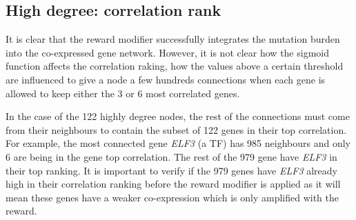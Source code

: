 \subsection{High degree: correlation rank} \label{s:N_II:corr_rank}




It is clear that the reward modifier successfully integrates the mutation burden into the co-expressed gene network. However, it is not clear how the sigmoid function affects the correlation raking, how the values above a certain threshold are influenced to give a node a few hundreds connections when each gene is allowed to keep either the 3 or 6 most correlated genes.

In the case of the 122 highly degree nodes, the rest of the connections must come from their neighbours to contain the subset of 122 genes in their top correlation. For example, the most connected gene \textit{ELF3} (a TF) has 985 neighbours and only 6 are being in the gene top correlation. The rest of the 979 gene have \textit{ELF3} in their top ranking. It is important to verify if the 979 genes have \textit{ELF3} already high in their correlation ranking before the reward modifier is applied as it will mean these genes have a weaker co-expression which is only amplified with the reward.

